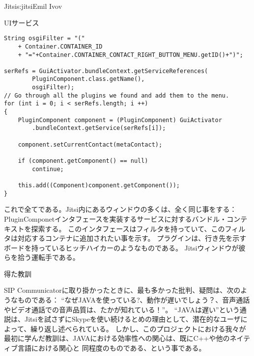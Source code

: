 \begin{aosachapter}{Jitsi}{s:jitsi}{Emil Ivov}
\begin{aosasect1}{UIサービス}
\begin{verbatim}
String osgiFilter = "("
    + Container.CONTAINER_ID
    + "="+Container.CONTAINER_CONTACT_RIGHT_BUTTON_MENU.getID()+")";

serRefs = GuiActivator.bundleContext.getServiceReferences(
        PluginComponent.class.getName(),
        osgiFilter);
// Go through all the plugins we found and add them to the menu.
for (int i = 0; i < serRefs.length; i ++)
{
    PluginComponent component = (PluginComponent) GuiActivator
        .bundleContext.getService(serRefs[i]);

    component.setCurrentContact(metaContact);

    if (component.getComponent() == null)
        continue;

    this.add((Component)component.getComponent());
}
\end{verbatim}

\noindent これで全てである。Jitsi内にあるウィンドウの多くは、全く同じ事をする：
PluginComponetインタフェースを実装するサービスに対するバンドル・コンテキストを探索する。
このインタフェースはフィルタを持っていて、このフィルタは対応するコンテナに追加されたい事を示す。
プラグインは、行き先を示すボードを持っているヒッチハイカーのようなものである。
Jitsiウィンドウが彼らを拾う運転手である。

\end{aosasect1}

\begin{aosasect1}{得た教訓}

SIP Communicatorに取り掛かったときに、最も多かった批判、疑問は、次のようなものである：
``なぜJAVAを使っている?、動作が遅いでしょう？、音声通話やビデオ通話での音声品質は、たかが知れている！''。
``JAVAは遅い''という通説は、Jitsiを試さずにSkypeを使い続けるとめの理由として、潜在的なユーザによって、繰り返し述べられている。
しかし、このプロジェクトにおける我々が最初に学んだ教訓は、JAVAにおける効率性への関心は、既にC++や他のネイティブ言語における関心と
同程度のものである、という事である。


\end{aosasect1}
\end{aosachapter}
